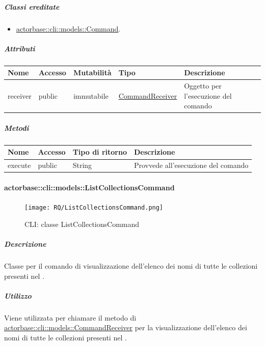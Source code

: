 \documentclass{scalatekids-article}
\begin{document}
\subparagraph{Classi ereditate}

\begin{itemize}
\item \hyperref[sec:actorbase::cli::models::Command]{actorbase::cli::models::Command}.
\end{itemize}

\subparagraph{Attributi}

\begin{tabular}{| p{1cm} | p{1.5cm} | p{2cm} | p{4cm} | p{8.5cm} |}
  \hline
  Nome & Accesso & Mutabilità & Tipo & Descrizione\\
  \hline
  receiver & public & immutabile & \hyperref[sec:actorbase::cli::models::CommandReceiver]{CommandReceiver} & Oggetto per l'esecuzione del comando\\
  \hline
\end{tabular}

\subparagraph{Metodi}

\begin{tabular}{| l | l | l | l |}
  \hline
  Nome & Accesso & Tipo di ritorno & Descrizione\\
  \hline
  execute & public & String & Provvede all'esecuzione del comando\\
  \hline
\end{tabular}

\paragraph{actorbase::cli::models::ListCollectionsCommand}
\label{sec:actorbase::cli::models::ListCollectionsCommand}

\begin{figure}[H]
  \begin{center}
    \texttt{[image: RQ/ListCollectionsCommand.png]}
    \caption{CLI: classe ListCollectionsCommand}
  \end{center}
\end{figure}

\subparagraph{Descrizione}

Classe per il comando di visualizzazione dell'elenco dei nomi di tutte le
collezioni presenti nel .

\subparagraph{Utilizzo}

Viene utilizzata per chiamare il metodo di
\hyperref[sec:actorbase::cli::models::CommandReceiver]{actorbase::cli::models::CommandReceiver} per la visualizzazione dell'elenco dei
nomi di tutte le collezioni presenti nel .
\end{document}
